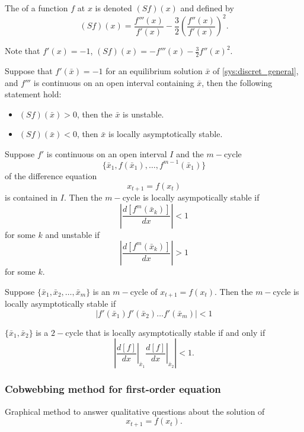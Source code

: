 \begin{definition}
The  of a function $f$ at $x$ is denoted $(Sf)(x)$ and defined by
$$(Sf)(x)=\frac{f'''(x)}{f'(x)}-\frac{3}{2}\left ( \frac{f''(x)}{f'(x)} \right )^2.$$
\end{definition}
Note that $f'(x)=-1$, $(Sf)(x)=-f'''(x)-\frac{3}{2} f''(x)^2.$
\begin{theorem}
Suppose that $f'(\bar x) =-1$ for an equilibrium solution $\bar x$ of \eqref{sys:discret_general}, and $f'''$ is continuous on an open interval containing $\bar x$, then the following statement hold:
\begin{itemize}
\item $(Sf)(\bar x)>0$, then the $\bar x$ is unstable.
\item $(Sf)(\bar x)<0$, then $\bar x$ is locally asymptotically stable.
\end{itemize}
\end{theorem}




\begin{theorem}
Suppose $f'$ is continuous on an open interval $I$ and the $m-$cycle
$$\{\bar x_1, f(\bar x_1), \dots , f^{m-1}(\bar x_1)\}$$
of the difference equation $$x_{t+1}=f(x_t)$$ is contained in $I$. Then the $m-$cycle is locally asympotically stable if
$$\left| \frac{d[f^m(\bar x_k)]}{dx}\right|<1$$
for some $k$ and unstable if
$$\left| \frac{d[f^m(\bar x_k)]}{dx}\right|>1$$
for some $k$.
\end{theorem}



\begin{corollary}
Suppose $\{\bar x_1, \bar x_2, \dots , \bar x_m\}$ is an $m-$cycle of $x_{t+1}=f(x_t)$. Then the $m-$cycle is locally asymptotically stable if $$\left |   f'(\bar x_1)f'(\bar x_2)\dots f'(\bar x_m)\right |<1$$
\end{corollary}

\begin{example}
$\{\bar x_1,\bar x_2\}$ is a $2-$cycle that is locally asymptotically stable if and only if $$\left| \left . \frac{d[f]}{dx}\right |_{\bar x_1}\left . \frac{d[f]}{dx}\right |_{\bar x_2}\right|<1.$$
\end{example}

\subsubsection{Cobwebbing method for first-order equation}
Graphical method to answer qualitative questions about the solution of $$x_{t+1}=f(x_t).$$

